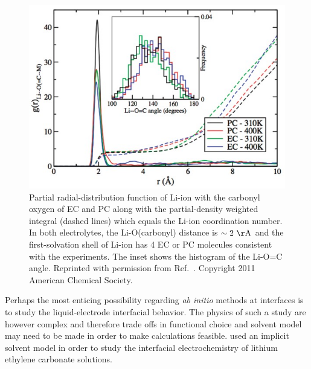 \documentclass[../main.tex]{subfiles}
\begin{document}
\begin{figure}
    \centering
    \includegraphics[scale=0.5]{figures/aimda.jpg}
    \caption{Partial radial-distribution function of Li-ion with the carbonyl oxygen of EC and PC along with the partial-density weighted integral (dashed lines) which equals the Li-ion coordination number. In both electrolytes, the Li-O(carbonyl) distance is $\rm \sim2~\AA$ and the first-solvation shell of Li-ion has 4 EC or PC molecules consistent with the experiments. The inset shows the histogram of the Li-O=C angle. Reprinted with permission from Ref.~. Copyright 2011 American Chemical Society.}
    \label{fig:leaimda}
\end{figure}

Perhaps the most enticing possibility regarding \textit{ab initio} methods at interfaces is to study the liquid-electrode interfacial behavior. The physics of such a study are however complex and therefore trade offs in functional choice and solvent model may need to be made in order to make calculations feasible. \citeauthor{lespes2015using} used an implicit solvent model in order to study the interfacial electrochemistry of lithium ethylene carbonate solutions\cite{lespes2015using}.
\end{document}
